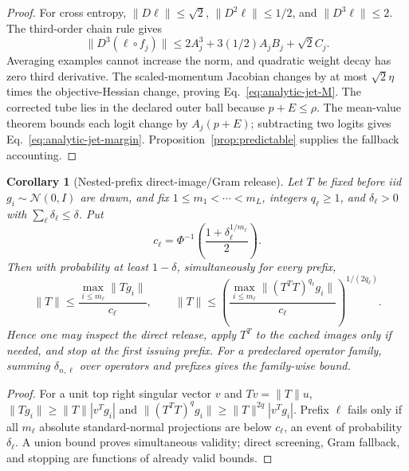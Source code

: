 \documentclass{article}
\newtheorem{corollary}{Corollary}
\begin{document}
\begin{proof}
For cross entropy,
$\|D\ell\|\le\sqrt2$, $\|D^2\ell\|\le1/2$, and
$\|D^3\ell\|\le2$.  The third-order chain rule gives
\begin{equation}
 \|D^3(\ell\circ f_j)\|
 \le2A_j^3+3(1/2)A_jB_j+\sqrt2C_j.
\end{equation}
Averaging examples cannot increase the norm, and quadratic weight decay has
zero third derivative.  The scaled-momentum Jacobian changes by at most
$\sqrt2\eta$ times the objective-Hessian change, proving
Eq.~\eqref{eq:analytic-jet-M}.  The corrected tube lies in the declared outer
ball because $p+E\le\rho$.  The mean-value theorem bounds each logit change by
$A_j(p+E)$; subtracting two logits gives Eq.~\eqref{eq:analytic-jet-margin}.
Proposition~\ref{prop:predictable} supplies the fallback accounting.
\end{proof}

\begin{corollary}[Nested-prefix direct-image/Gram release]
\label{cor:direct-image-prefix}
Let $T$ be fixed before iid $g_i\sim\mathcal N(0,I)$ are drawn, and fix
$1\le m_1<\cdots<m_L$, integers $q_\ell\ge1$, and
$\delta_\ell>0$ with $\sum_\ell\delta_\ell\le\delta$.  Put
\begin{equation}
 c_\ell=\Phi^{-1}\!\left(
 \frac{1+\delta_\ell^{1/m_\ell}}{2}\right).
\end{equation}
Then with probability at least $1-\delta$, simultaneously for every prefix,
\begin{equation}
 \|T\|\le\frac{\max_{i\le m_\ell}\|Tg_i\|}{c_\ell},
 \qquad
 \|T\|\le
 \left(\frac{\max_{i\le m_\ell}\|(T^TT)^{q_\ell}g_i\|}{c_\ell}
 \right)^{1/(2q_\ell)}.
 \label{eq:direct-gram-release}
\end{equation}
Hence one may inspect the direct release, apply $T^T$ to the cached images only
if needed, and stop at the first issuing prefix.  For a predeclared operator
family, summing $\delta_{n,\ell}$ over operators and prefixes gives the
family-wise bound.
\end{corollary}

\begin{proof}
For a unit top right singular vector $v$ and $Tv=\|T\|u$,
$\|Tg_i\|\ge\|T\||v^Tg_i|$ and
$\|(T^TT)^qg_i\|\ge\|T\|^{2q}|v^Tg_i|$.  Prefix $\ell$ fails only if all
$m_\ell$ absolute standard-normal projections are below $c_\ell$, an event of
probability $\delta_\ell$.  A union bound proves simultaneous validity; direct
screening, Gram fallback, and stopping are functions of already valid bounds.
\end{proof}
\end{document}

